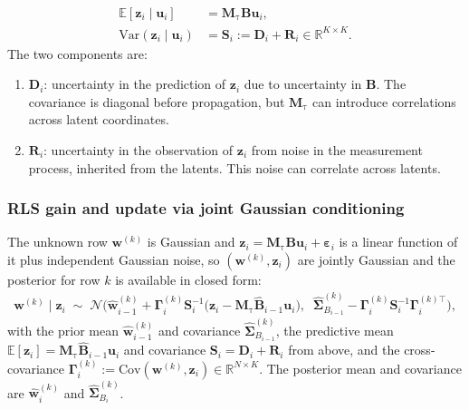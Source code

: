 \documentclass[11pt,letterpaper]{article} %
\begin{document}
\begin{align*}
    \mathbb{E}[\bm{z}_i\mid\bm{u}_i]
    &=
    \bm{M}_{\mathrm{\tau}}
    \bm{B}\bm{u}_i,
    \\
    \mathrm{Var}(\bm{z}_i\mid\bm{u}_i)
    &=
    \bm{S}_i
    :=
    \bm{D}_i+\bm{R}_i
    \in\mathbb{R}^{K\times K}.
\end{align*}
The two components are:
\begin{enumerate}[itemsep=0em, topsep=0.2em]
    \item $\bm{D}_i$: uncertainty in the prediction of $\bm{z}_i$ due to uncertainty in $\bm{B}$. The covariance is diagonal before propagation, but $\bm{M}_{\mathrm{\tau}}$ can introduce correlations across latent coordinates.
    \item $\bm{R}_i$: uncertainty in the observation of $\bm{z}_i$ from noise in the measurement process, inherited from the latents. This noise can correlate across latents.
\end{enumerate}
\clearpage

\subsubsection*{RLS gain and update via joint Gaussian conditioning}
The unknown row $\bm{w}^{(k)}$ is Gaussian and $\bm{z}_i = \bm{M}_{\mathrm{\tau}}\bm{B}\bm{u}_i + \boldsymbol{\varepsilon}_i$ is a linear
function of it plus independent Gaussian noise, so $(\bm{w}^{(k)}, \bm{z}_i)$ are jointly Gaussian and
the posterior for row $k$ is available in closed form:
\begin{align*}
    \bm{w}^{(k)} \mid \bm{z}_i \;\sim\; \mathcal{N}\Big(
        \hat{\bm{w}}_{i-1}^{(k)} + \bm{\Gamma}_i^{(k)}\bm{S}_i^{-1}\big(\bm{z}_i - \bm{M}_{\mathrm{\tau}}\hat{\bm{B}}_{i-1}\bm{u}_i\big),
        \;\;
        \hat{\bm{\Sigma}}_{B_{i-1}}^{(k)} - \bm{\Gamma}_i^{(k)}\bm{S}_i^{-1}\bm{\Gamma}_i^{(k)\top}
    \Big),
\end{align*}
with the prior mean $\hat{\bm{w}}_{i-1}^{(k)}$ and covariance $\hat{\bm{\Sigma}}_{B_{i-1}}^{(k)}$, the predictive mean $\mathbb{E}[\bm{z}_i] = \bm{M}_{\mathrm{\tau}}\hat{\bm{B}}_{i-1}\bm{u}_i$ and covariance $\bm{S}_i = \bm{D}_i + \bm{R}_i$ from above, and the cross-covariance
$\bm{\Gamma}_i^{(k)} := \mathrm{Cov}(\bm{w}^{(k)}, \bm{z}_i) \in \mathbb{R}^{N\times K}$.
The posterior mean and covariance are $\hat{\bm{w}}_{i}^{(k)}$ and $\hat{\bm{\Sigma}}_{B_i}^{(k)}$.
\end{document}
